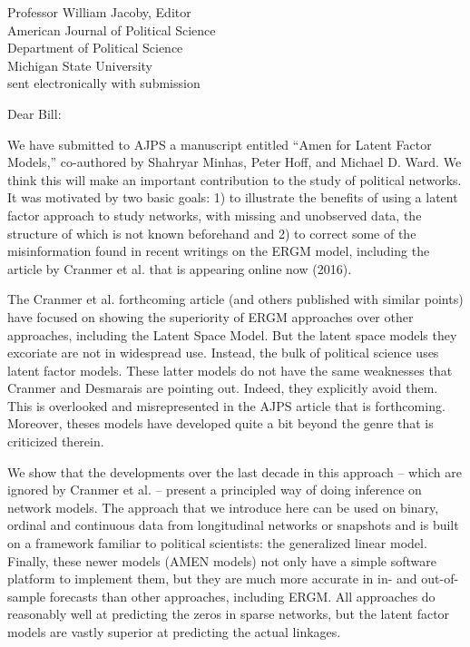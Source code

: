 \documentclass[10pt]{letter}
\begin{document}
\begin{letter}
{Professor William Jacoby, Editor\\
American Journal of Political Science\\
Department of Political Science\\
Michigan State University\\
sent electronically with submission}


\opening{Dear Bill:}

We have submitted to AJPS a manuscript entitled ``Amen for Latent Factor Models,'' co-authored by Shahryar Minhas, Peter Hoff, and Michael D. Ward.  We think this will make an important contribution to the study of political networks.  It was motivated by two basic goals: 1) to illustrate the benefits of using a latent factor approach to study networks, with missing and unobserved data, the structure of which is not known beforehand and 2) to correct some of the misinformation found in recent writings on the ERGM model, including the article by Cranmer et al. that is appearing online now (2016).

The Cranmer et al. forthcoming article (and others published with similar points) have focused on showing the superiority of ERGM approaches over other approaches, including the Latent Space Model.  But the latent space models they excoriate are not in widespread use. Instead, the bulk of political science uses latent factor models. These latter models do not have the same weaknesses that Cranmer and Desmarais are pointing out. Indeed, they explicitly avoid them. This is overlooked and misrepresented in the AJPS article that is forthcoming. Moreover, theses models have developed quite a bit beyond the genre that is criticized therein.  

We show that the developments over the last decade in this approach -- which are ignored by Cranmer et al. -- present a principled way of doing inference on network models. The approach that we introduce here can be used on binary, ordinal and continuous data from longitudinal networks or snapshots and is built on a framework familiar to political scientists: the generalized linear model. Finally, these newer models (AMEN models) not only have a simple software platform to implement them, but they are much more accurate in in- and out-of-sample forecasts than other approaches, including ERGM.  All approaches do reasonably well at predicting the zeros in sparse networks, but the latent factor models are vastly superior at predicting the actual linkages. 


\end{letter}
\end{document}
